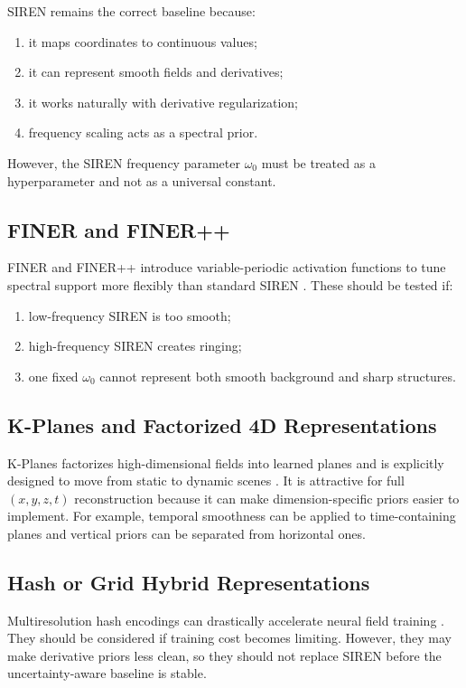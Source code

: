 \documentclass[11pt]{article}
\begin{document}
SIREN remains the correct baseline because:
\begin{enumerate}[leftmargin=*]
  \item it maps coordinates to continuous values;
  \item it can represent smooth fields and derivatives;
  \item it works naturally with derivative regularization;
  \item frequency scaling acts as a spectral prior.
\end{enumerate}
However, the SIREN frequency parameter $\omega_0$ must be treated as a hyperparameter and not
as a universal constant.

\subsection{FINER and FINER++}

FINER and FINER++ introduce variable-periodic activation functions to tune spectral support more
flexibly than standard SIREN \cite{Liu2023FINER,Zhu2024FINERPP}. These should be tested if:
\begin{enumerate}[leftmargin=*]
  \item low-frequency SIREN is too smooth;
  \item high-frequency SIREN creates ringing;
  \item one fixed $\omega_0$ cannot represent both smooth background and sharp structures.
\end{enumerate}

\subsection{K-Planes and Factorized 4D Representations}

K-Planes factorizes high-dimensional fields into learned planes and is explicitly designed to move
from static to dynamic scenes \cite{FridovichKeil2023KPlanes}. It is attractive for full
$(x,y,z,t)$ reconstruction because it can make dimension-specific priors easier to implement. For
example, temporal smoothness can be applied to time-containing planes and vertical priors can be
separated from horizontal ones.

\subsection{Hash or Grid Hybrid Representations}

Multiresolution hash encodings can drastically accelerate neural field training
\cite{Muller2022InstantNGP}. They should be considered if training cost becomes limiting.
However, they may make derivative priors less clean, so they should not replace SIREN before
the uncertainty-aware baseline is stable.
\end{document}
